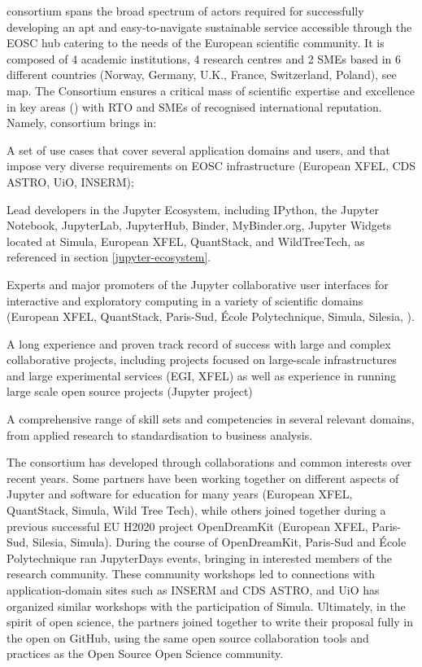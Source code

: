\TheProject consortium spans the broad spectrum of actors required 
for successfully developing an apt and easy-to-navigate sustainable 
service accessible through the EOSC hub catering to the needs of 
the European scientific community. It is composed of 4 academic 
institutions, 4 research centres and 2 SMEs based in 6 different countries 
(\TOCHECK Norway, Germany, U.K., France, Switzerland, Poland), \TODO see 
map. The Consortium ensures a critical mass of scientific expertise 
and excellence in key areas (\TODO) with RTO and SMEs 
of recognised international reputation. Namely, \TheProject consortium brings in:
\begin{compactitem}
\item A set of use cases that cover several application domains and users, and that impose very diverse requirements on EOSC infrastructure (European XFEL, CDS ASTRO, UiO, INSERM);
\item Lead developers in the Jupyter Ecosystem, including IPython, the Jupyter Notebook, JupyterLab, JupyterHub, Binder, MyBinder.org, Jupyter Widgets located at Simula, European XFEL, QuantStack, and WildTreeTech,
as referenced in section \ref{jupyter-ecosystem}.
\item Experts and major promoters of the Jupyter collaborative user interfaces for interactive and exploratory computing in a variety of scientific domains (European XFEL, QuantStack, Paris-Sud, \'Ecole Polytechnique, Simula, Silesia, ).
\item A long experience and proven track record of success with large and complex collaborative projects, including projects focused on large-scale infrastructures and large experimental services (EGI, XFEL) as well as experience in running large scale open source projects (Jupyter project)
\item A comprehensive range of skill sets and competencies in several relevant domains, from applied research to standardisation to business
analysis.
\end{compactitem}

The consortium has developed through collaborations and common interests over recent years.
Some partners have been working together on different aspects of Jupyter
and software for education for many years (European XFEL, QuantStack, Simula, Wild Tree Tech),
while others joined together during a previous successful EU H2020 project OpenDreamKit (European XFEL, Paris-Sud, Silesia, Simula).
During the course of OpenDreamKit, Paris-Sud and \'Ecole Polytechnique
ran JupyterDays events, bringing in interested members of the research community.
These community workshops led to connections with application-domain sites such as INSERM and CDS ASTRO,
and UiO has organized similar workshops with the participation of Simula.
Ultimately, in the spirit of open science,
the partners joined together to write their proposal fully in the open on GitHub,
using the same open source collaboration tools and practices
as the Open Source Open Science community.

